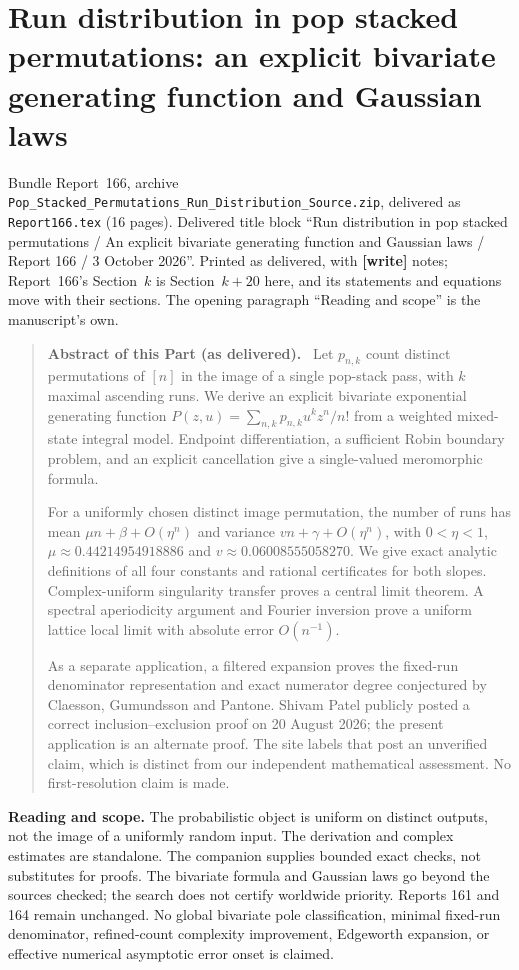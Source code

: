 \documentclass[11pt,letterpaper]{article}
\numberwithin{equation}{section}
\theoremstyle{remark}\newtheorem{remark}[theorem]{Remark}
\newcommand{\file}[1]{\nolinkurl{#1}}
\newenvironment{partabstract}{\begin{quote}\small\noindent\textbf{Abstract of this Part (as delivered).}\ }{\end{quote}}
\newcommand{\partsource}[1]{\par\noindent\begin{minipage}{\textwidth}\small #1\end{minipage}\par\medskip}
\begin{document}
\part{Run distribution in pop stacked permutations: an explicit bivariate generating function and Gaussian laws}\label{psp:run:part}
\partsource{Bundle Report~166, archive \file{Pop_Stacked_Permutations_Run_Distribution_Source.zip}, delivered as \file{Report166.tex} (16 pages). Delivered title block ``Run distribution in pop stacked permutations / An explicit bivariate generating function and Gaussian laws / Report 166 / 3 October 2026''. Printed as delivered, with \textbf{[write]} notes; Report~166's Section~$k$ is Section~$k+20$ here, and its statements and equations move with their sections. The opening paragraph ``Reading and scope'' is the manuscript's own.}
\begin{partabstract}
Let $p_{n,k}$ count distinct permutations of $[n]$ in the image of a single
pop-stack pass, with $k$ maximal ascending runs. We derive an explicit
bivariate exponential generating function
$P(z,u)=\sum_{n,k}p_{n,k}u^kz^n/n!$ from a weighted mixed-state integral
model. Endpoint differentiation, a sufficient Robin boundary problem,
and an explicit cancellation give a single-valued meromorphic formula.

For a uniformly chosen distinct image permutation, the number of runs
has mean $\mu n+\beta+O(\eta^n)$ and variance $vn+\gamma+O(\eta^n)$, with
$0<\eta<1$, $\mu\approx0.44214954918886$ and
$v\approx0.06008555058270$. We give exact analytic definitions of all
four constants and rational certificates for both slopes. Complex-uniform
singularity transfer proves a central limit theorem. A spectral
aperiodicity argument and Fourier inversion prove a uniform lattice
local limit with absolute error $O(n^{-1})$.

As a separate application, a filtered expansion proves the fixed-run
denominator representation and exact numerator degree conjectured by
Claesson, Gu\dh mundsson and Pantone. Shivam Patel publicly posted a
correct inclusion--exclusion proof on 20 August 2026; the present
application is an alternate proof. The site labels that post an
unverified claim, which is distinct from our independent mathematical
assessment. No first-resolution claim is made.
\end{partabstract}
\noindent\textbf{Reading and scope.}
The probabilistic object is uniform on distinct outputs, not the image
of a uniformly random input. The derivation and complex estimates are
standalone. The companion supplies bounded exact checks, not substitutes
for proofs. The bivariate formula and Gaussian laws go beyond the sources
checked; the search does not certify worldwide priority. Reports 161
and 164 remain unchanged. No global bivariate pole classification,
minimal fixed-run denominator, refined-count complexity improvement,
Edgeworth expansion, or effective numerical asymptotic error onset is
claimed.
\end{document}
